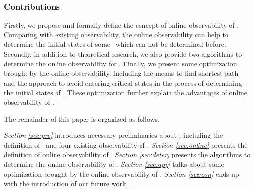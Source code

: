 \subsubsection*{Contributions}
Firstly, we propose and formally define the concept of online observability of \BCNs. Comparing with existing observability, the online observability can help to determine the initial states of some \BCNs\ which can not be determined before. Secondly, in addition to theoretical research, we also provide two algorithms to determine the online observability for \BCNs. Finally, we present some optimization brought by the online observability. Including the means to find shortest path and the approach to avoid entering critical states in the process of determining the initial states of \BCNs.  These optimization further explain the advantages of online observability of \BCNs. 

The remainder of this paper is organized as follows.

 {\em Section \ref{sec:pre}} introduces necessary preliminaries about \BCNs, including the definition of \BCNs\ and four existing observability of \BCNs. {\em Section \ref{sec:online}} presents the definition of online observability of \BCNs. {\em Section \ref{sec:deter}} presents the algorithms to determine the online observability of \BCNs. {\em Section \ref{sec:app}} talks about some optimization brought by the online observability of \BCNs. {\em Section \ref{sec:con}} ends up with the introduction of our future work.

